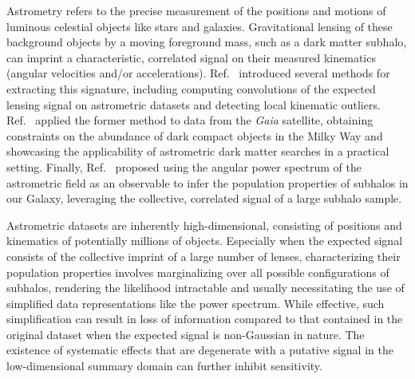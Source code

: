 \documentclass[]{article}
\begin{document}
Astrometry refers to the precise measurement of the positions and motions of luminous celestial objects like stars and galaxies. Gravitational lensing of these background objects by a moving foreground mass, such as a dark matter subhalo, can imprint a characteristic, correlated signal on their measured kinematics (angular velocities and/or accelerations). Ref.~\cite{VanTilburg:2018ykj} introduced several methods for extracting this signature, including computing convolutions of the expected lensing signal on astrometric datasets and detecting local kinematic outliers. Ref.~\cite{Mondino:2020rkn} applied the former method to data from the \emph{Gaia} satellite, obtaining constraints on the abundance of dark compact objects in the Milky Way and showcasing the applicability of astrometric dark matter searches in a practical setting. Finally, Ref.~\cite{Mishra-Sharma:2020ynk} proposed using the angular power spectrum of the astrometric field as an observable to infer the population properties of subhalos in our Galaxy, leveraging the collective, correlated signal of a large subhalo sample. 

Astrometric datasets are inherently high-dimensional, consisting of positions and kinematics of potentially millions of objects. Especially when the expected signal consists of the collective imprint of a large number of lenses, characterizing their population properties involves marginalizing over all possible configurations of subhalos, rendering the likelihood intractable and usually necessitating the use of simplified data representations like the power spectrum. While effective, such simplification can result in loss of information compared to that contained in the original dataset when the expected signal is non-Gaussian in nature. The existence of systematic effects that are degenerate with a putative signal in the low-dimensional summary domain can further inhibit sensitivity. 
\end{document}
